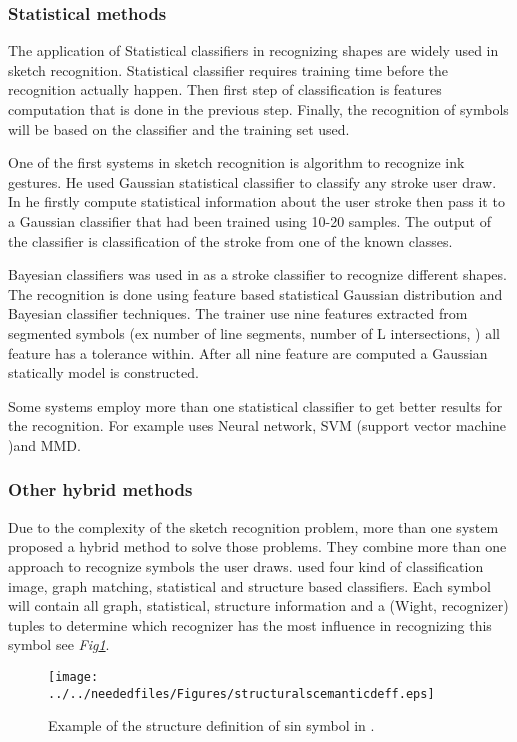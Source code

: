 \subsubsection{Statistical methods}
\label{sec:Statisticalmethods}

The application of Statistical classifiers in recognizing shapes are widely used in sketch recognition. Statistical classifier requires training time before the recognition actually happen. Then first step of classification is features computation that is done in the previous step. Finally, the recognition of symbols will be based on the classifier and the training set used.  

One of the first systems in sketch recognition is \citep{gestureexample12,aideddesgin22} algorithm to recognize ink gestures. He used Gaussian statistical classifier to classify any stroke user draw.  In \cite {gestureexample12}  he firstly compute statistical information about the user stroke then pass it to a Gaussian classifier that had been trained using 10-20 samples. The output of the classifier is classification of the stroke from one of the known classes.

Bayesian classifiers was used in \cite{Vibratory8} as a stroke classifier to recognize different shapes. The recognition is done using feature based statistical Gaussian distribution and Bayesian classifier techniques. The trainer use nine features extracted from segmented symbols (ex number of line segments, number of L intersections, ) all feature has a tolerance within. After all nine feature are computed a Gaussian statically model is constructed.
 
Some systems employ more than one statistical classifier to get better results for the recognition. For example \cite{zernike61} uses Neural network, SVM (support vector machine )and MMD. \cite{polygonfeedback31}

\subsubsection{Other hybrid methods}
\label{sec:Other hybrid methods}

Due to the complexity of the sketch recognition problem, more than one system proposed a hybrid method to solve those problems. They combine more than one approach to recognize symbols the user draws.
\cite{sketchunderstanding1,Simusketch51}  used four kind of classification image, graph matching, statistical and structure based classifiers. Each symbol will contain all graph, statistical, structure information and a (Wight, recognizer) tuples to determine which recognizer has the most influence in recognizing this symbol see \textit{Fig\ref{fig:structuralscemanticdeff}}.
\begin{figure}
	\centering
		\texttt{[image: ../../neededfiles/Figures/structuralscemanticdeff.eps]}
	\caption[Structure definitions]{Example of the structure definition of sin symbol in \cite{sketchunderstanding1}.}
	\label{fig:structuralscemanticdeff}
\end{figure}

